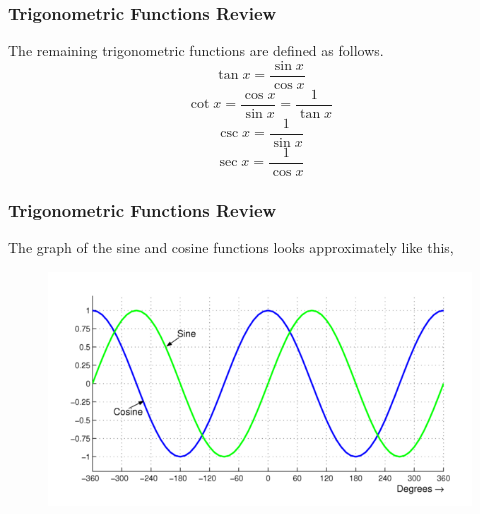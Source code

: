 \documentclass[xcolor=dvipsnames]{beamer}
\begin{document}
\begin{frame}
  \frametitle{Trigonometric Functions Review}
  The remaining trigonometric functions are defined as follows.
  \begin{equation}
    \label{eq:eiyiexir}
    \tan{}x=\frac{\sin{}x}{\cos{}x}
  \end{equation}
  \begin{equation}
    \label{eq:dohquohb}
    \cot{}x=\frac{\cos{}x}{\sin{}x}=\frac{1}{\tan{}x}
  \end{equation}
  \begin{equation}
    \label{eq:eengohqu}
    \csc{}x=\frac{1}{\sin{}x}
  \end{equation}
  \begin{equation}
    \label{eq:eipuoxei}
    \sec{}x=\frac{1}{\cos{}x}
  \end{equation}
\end{frame}

\begin{frame}
  \frametitle{Trigonometric Functions Review}
  The graph of the sine and cosine functions looks approximately like
  this,
  \begin{figure}[h]
    \includegraphics[scale=2]{./diagrams/sinecosine.png}
  \end{figure}
\end{frame}
\end{document}
